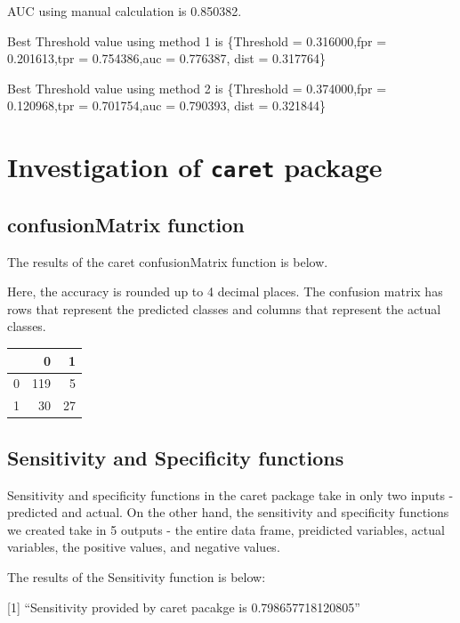 \documentclass[]{article}
\begin{document}
AUC using manual calculation is 0.850382.

Best Threshold value using method 1 is \{Threshold = 0.316000,fpr =
0.201613,tpr = 0.754386,auc = 0.776387, dist = 0.317764\}

Best Threshold value using method 2 is \{Threshold = 0.374000,fpr =
0.120968,tpr = 0.701754,auc = 0.790393, dist = 0.321844\}

\clearpage

\section{\texorpdfstring{Investigation of \texttt{caret}
package}{Investigation of caret package}}\label{investigation-of-caret-package}

\subsection{confusionMatrix function}\label{confusionmatrix-function}

The results of the caret confusionMatrix function is below.

Here, the accuracy is rounded up to 4 decimal places. The confusion
matrix has rows that represent the predicted classes and columns that
represent the actual classes.

\begin{table}[ht]
\centering
\begin{tabular}{rrr}
  \hline
 & 0 & 1 \\ 
  \hline
0 & 119 &   5 \\ 
  1 &  30 &  27 \\ 
   \hline
\end{tabular}
\end{table}

\subsection{Sensitivity and Specificity
functions}\label{sensitivity-and-specificity-functions}

Sensitivity and specificity functions in the caret package take in only
two inputs - predicted and actual. On the other hand, the sensitivity
and specificity functions we created take in 5 outputs - the entire data
frame, preidicted variables, actual variables, the positive values, and
negative values.

The results of the Sensitivity function is below:

{[}1{]} ``Sensitivity provided by caret pacakge is 0.798657718120805''
\end{document}
